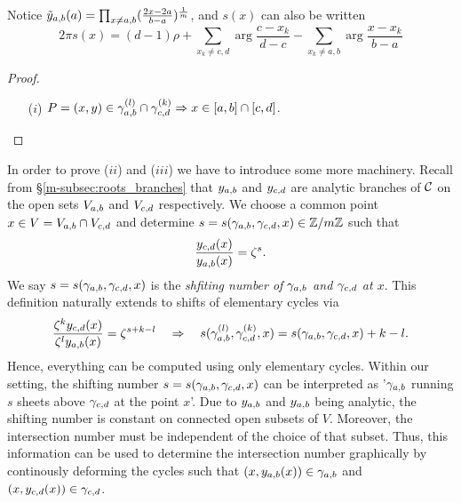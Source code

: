 \documentclass[main.tex]{subfiles}
\begin{document}
 \todo Notice $\tilde{y}_{a,b}(a) = \prod_{x\neq a,b}(\frac{2x-2a}{b-a})^{\frac1m}$, and
 $s(x)$ can also be written
      \begin{equation}
      2π s(x) = (d-1)\rho
      + \sum_{x_k\neq c,d}\arg \frac{c-x_k}{d-c}
      - \sum_{x_k\neq a,b}\arg \frac{x-x_k}{b-a}
      \end{equation}

  \begin{proof}\let\qed\relax
   \begin{itemize}
    \item[($i$)] $P = (x,y) \in \gamma_{a,b}^{(l)} \cap \gamma_{c,d}^{(k)}   \Rightarrow  x \in [a,b] \cap [c,d]$.
   \end{itemize}
  \end{proof}

  In order to prove ($ii$) and ($iii$) we have to introduce some more machinery. Recall from \S \ref{m-subsec:roots_branches} that $y_{a,b}$ and $y_{c,d}$ are analytic branches of $\mathcal{C}$ on the open sets
  $V_{a,b}$ and $V_{c,d}$ respectively. \abstandl
  We choose a common point $x \in V = V_{a,b} \cap V_{c,d}$ and determine $s  = s(\gamma_{a,b},\gamma_{c,d},x) \in \mathbb{Z}/m\mathbb{Z}$  such that
  \begin{align}
   \frac{y_{c,d}(x)}{y_{a,b}(x)} = \zeta^s .
  \end{align}
  We say $s  = s(\gamma_{a,b},\gamma_{c,d},x)$ is the \emph{shfiting number of $\gamma_{a,b}$ and $\gamma_{c,d}$ at $x$}.
  This definition naturally extends to shifts of elementary cycles via
\begin{align}\label{eq:shift_numb_rel}
  \frac{\zeta^ky_{c,d}(x)}{\zeta^ly_{a,b}(x)} = \zeta^{s+k-l} \quad \Rightarrow \quad s(\gamma_{a,b}^{(l)},\gamma_{c,d}^{(k)},x) = s(\gamma_{a,b},\gamma_{c,d},x) + k - l.
\end{align}
 Hence, everything can be computed using only elementary cycles. \abstandl
 Within our setting, the shifting number $s=s(\gamma_{a,b},\gamma_{c,d},x)$  can be interpreted as '$\gamma_{a,b}$ running $s$ sheets above $\gamma_{c,d}$ at the point $x$'.
 Due to $y_{a,b}$ and $y_{a,b}$ being analytic, the shifting number is constant on connected open subsets of $V$. Moreover, the intersection number must be independent of the choice of that subset. \abstandl
 Thus,
 this information can be used to determine
 the intersection number graphically by continously deforming the cycles such that $(x,y_{a,b}(x)) \in \gamma_{a,b}$ and $(x,y_{c,d}(x)) \in \gamma_{c,d}$.
\end{document}

